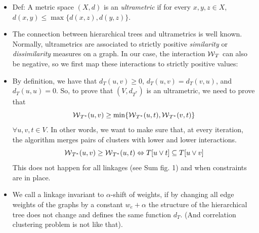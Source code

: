\begin{itemize}
\item Def: A metric space $(X,d)$ is an \emph{ultrametric} if for every $x,y,z \in X$, $d(x,y)\leq \max \{d(x,z), d(y,z)\}$.
\item The connection between hierarchical trees and ultrametrics is well known. Normally, ultrametrics are associated to strictly positive \emph{similarity} or \emph{dissimilarity} measures on a graph. In our case, the interaction $\mathcal{W}{}_{T}{}$ can also be negative, so we first map these interactions to strictly positive values:

\item By definition, we have that $d_T(u,v)\geq 0$, $d_T(u,v)=d_T(v,u)$, and $d_T(u,u)= 0$. So, to prove that $(V, d_{T^*})$ is an ultrametric, we need to prove that
\begin{equation}
\mathcal{W}{}_{T^*}(u,v) \geq \min \{\mathcal{W}{}_{T^*}(u,t), \mathcal{W}{}_{T^*}(v,t)\}
\end{equation}
 $\forall u,v,t\in V$. In other words, we want to make sure that, at every iteration, the algorithm merges pairs of clusters with lower and lower interactions. 
\begin{equation}
\mathcal{W}{}_{T^*}(u,v) \geq \mathcal{W}{}_{T^*}(u,t) \Leftrightarrow T[u \vee t] \subseteq T[u \vee v] 
\end{equation}
This does not happen for all linkages (see Sum fig. 1) and when constraints are in place.  
\item We call a linkage invariant to $\alpha$-shift of weights, if by changing all edge weights of the graphs by a constant $w_e+\alpha$ the structure of the hierarchical tree  does not change and defines the same function $d_T$. (And correlation clustering problem is not like that).
\end{itemize}

